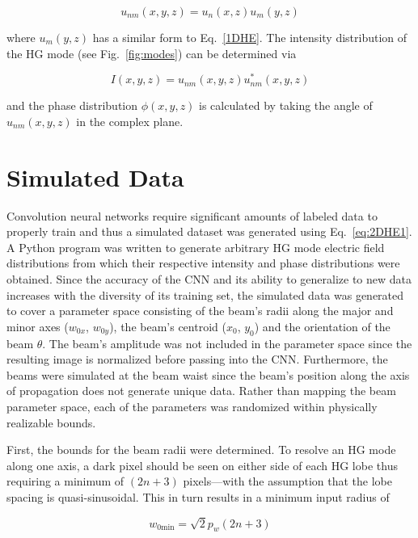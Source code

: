 \documentclass[10pt,journal,compsoc]{IEEEtran}
\begin{document}
\begin{equation}
u_{nm}(x, y, z)=u_n(x, z)u_m(y, z)
\label{eq:2DHE1}
\end{equation}

\noindent where $u_m(y, z)$ has a similar form to Eq.~\ref{1DHE}. The intensity distribution of the HG mode (see Fig.~\ref{fig:modes}) can be determined \cite{ross2013laser} via

\begin{equation}
I(x,y,z)=u_{nm}(x, y, z)u_{nm}^*(x, y, z)
\end{equation}

\noindent and the phase distribution $\phi(x, y, z)$ is calculated by taking the angle of $u_{nm}(x, y, z)$ in the complex plane.

\section*{Simulated Data}\label{sec:simulated}
Convolution neural networks require significant amounts of labeled data to properly train and thus a simulated dataset was generated using Eq.~\ref{eq:2DHE1}. A Python program was written to generate arbitrary HG mode electric field distributions from which their respective intensity and phase distributions were obtained. Since the accuracy of the CNN and its ability to generalize to new data increases with the diversity of its training set, the simulated data was generated to cover a parameter space consisting of the beam's radii along the major and minor axes ($w_{0x}$, $w_{0y}$), the beam's centroid ($x_0$, $y_0$) and the orientation of the beam $\theta$. The beam's amplitude was not included in the parameter space since the resulting image is normalized before passing into the CNN. Furthermore, the beams were simulated at the beam waist since the beam's position along the axis of propagation does not generate unique data. Rather than mapping the beam parameter space, each of the parameters was randomized within physically realizable bounds.

First, the bounds for the beam radii were determined.  To resolve an HG mode along one axis, a dark pixel should be seen on either side of each HG lobe thus requiring a minimum of $\left(2n+3\right)$ pixels---with the assumption that the lobe spacing is quasi-sinusoidal. This in turn results in a minimum input radius of

\begin{equation}
w_{0\text{min}}=\sqrt{2}p_w\left(2n+3\right)
\label{eq:wmin}
\end{equation}
\end{document}

